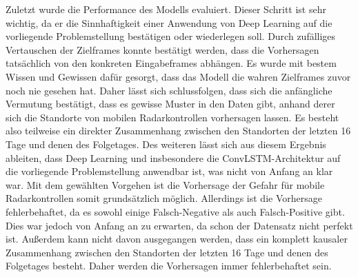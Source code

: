 Zuletzt wurde die Performance des Modells evaluiert.
Dieser Schritt ist sehr wichtig, da er die Sinnhaftigkeit einer Anwendung von Deep Learning auf die vorliegende Problemstellung bestätigen oder wiederlegen soll.
Durch zufälliges Vertauschen der Zielframes konnte bestätigt werden, dass die Vorhersagen tatsächlich von den konkreten Eingabeframes abhängen.
Es wurde mit bestem Wissen und Gewissen dafür gesorgt, dass das Modell die wahren Zielframes zuvor noch nie gesehen hat.
Daher lässt sich schlussfolgen, dass sich die anfängliche Vermutung bestätigt, dass es gewisse Muster in den Daten gibt, anhand derer sich die Standorte von mobilen Radarkontrollen vorhersagen lassen.
Es besteht also teilweise ein direkter Zusammenhang zwischen den Standorten der letzten 16 Tage und denen des Folgetages.
Des weiteren lässt sich aus diesem Ergebnis ableiten, dass Deep Learning und insbesondere die ConvLSTM-Architektur auf die vorliegende Problemstellung anwendbar ist, was nicht von Anfang an klar war.
Mit dem gewählten Vorgehen ist die Vorhersage der Gefahr für mobile Radarkontrollen somit grundsätzlich möglich.
Allerdings ist die Vorhersage fehlerbehaftet, da es sowohl einige Falsch-Negative als auch Falsch-Positive gibt.
Dies war jedoch von Anfang an zu erwarten, da schon der Datensatz nicht perfekt ist.
Außerdem kann nicht davon ausgegangen werden, dass ein komplett kausaler Zusammenhang zwischen den Standorten der letzten 16 Tage und denen des Folgetages besteht.
Daher werden die Vorhersagen immer fehlerbehaftet sein.

